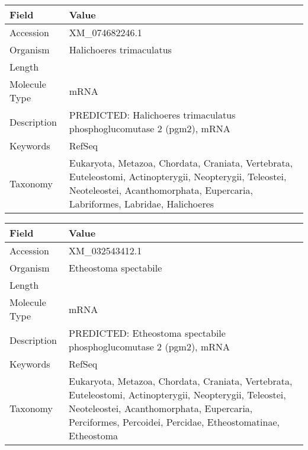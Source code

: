 \documentclass[10pt]{article}
\begin{document}
\vspace{1em}
{\footnotesize
\begin{longtable}{>{\raggedright\arraybackslash}p{4.5cm} >{\raggedright\arraybackslash}p{11.5cm}}
\textbf{Field} & \textbf{Value} \\
\hline
Accession & XM\_074682246.1 \\
Organism & Halichoeres trimaculatus \\
Length & 2901 \\
Molecule Type & mRNA \\
Description & PREDICTED: Halichoeres trimaculatus phosphoglucomutase 2 (pgm2), mRNA \\
Keywords & RefSeq \\
Taxonomy & Eukaryota, Metazoa, Chordata, Craniata, Vertebrata, Euteleostomi, Actinopterygii, Neopterygii, Teleostei, Neoteleostei, Acanthomorphata, Eupercaria, Labriformes, Labridae, Halichoeres \\
\end{longtable}
}

\vspace{1em}
{\footnotesize
\begin{longtable}{>{\raggedright\arraybackslash}p{4.5cm} >{\raggedright\arraybackslash}p{11.5cm}}
\textbf{Field} & \textbf{Value} \\
\hline
Accession & XM\_032543412.1 \\
Organism & Etheostoma spectabile \\
Length & 2316 \\
Molecule Type & mRNA \\
Description & PREDICTED: Etheostoma spectabile phosphoglucomutase 2 (pgm2), mRNA \\
Keywords & RefSeq \\
Taxonomy & Eukaryota, Metazoa, Chordata, Craniata, Vertebrata, Euteleostomi, Actinopterygii, Neopterygii, Teleostei, Neoteleostei, Acanthomorphata, Eupercaria, Perciformes, Percoidei, Percidae, Etheostomatinae, Etheostoma \\
\end{longtable}
}

\vspace{1em}
\end{document}
